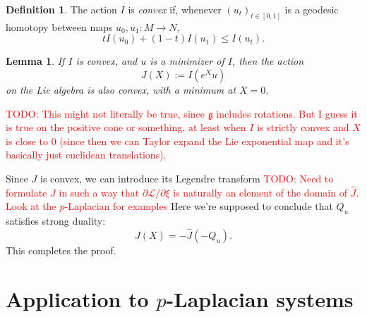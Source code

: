 \documentclass[reqno,11pt]{amsart}
\newcommand{\Lagrange}{\mathscr L}
\newcommand{\dfn}[1]{\emph{#1}\index{#1}}
\newtheorem{lemma}[theorem]{Lemma}
\theoremstyle{definition}
\newtheorem{definition}[theorem]{Definition}
\numberwithin{equation}{section}
\newcommand\todo[1]{\textcolor{red}{TODO: #1}}
\begin{document}
\begin{definition}
The action $I$ is \dfn{convex} if, whenever $(u_t)_{t \in [0, 1]}$ is a geodesic homotopy between maps $u_0, u_1: M \to N$,
$$tI(u_0) + (1 - t)I(u_1) \leq I(u_t).$$
\end{definition}

\begin{lemma}
If $I$ is convex, and $u$ is a minimizer of $I$, then the action
$$J(X) := I(e^X u)$$
on the Lie algebra is also convex, with a minimum at $X = 0$.
\end{lemma}

\todo{This might not literally be true, since $\mathfrak g$ includes rotations.
But I guess it is true on the positive cone or something, at least when $I$ is strictly convex and $X$ is close to $0$ (since then we can Taylor expand the Lie exponential map and it's basically just euclidean translations).}

Since $J$ is convex, we can introduce its Legendre transform \todo{Need to formulate $J$ in such a way that $\partial \Lagrange/\partial \xi$ is naturally an element of the domain of $\hat J$. Look at the $p$-Laplacian for examples}
Here we're supposed to conclude that $Q_u$ satisfies strong duality:
$$J(X) = -\hat J(-Q_u).$$
This completes the proof.

\section{Application to \texorpdfstring{$p$-Laplacian}{p-Laplacian} systems}


\printbibliography
\end{document}
